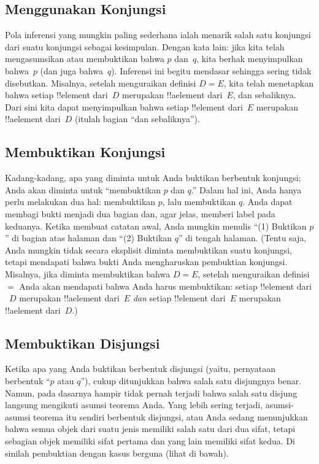 \documentclass[../../../include/open-logic-section]{subfiles}
\begin{document}
\subsection{Menggunakan Konjungsi}

Pola inferensi yang mungkin paling sederhana ialah menarik salah satu
konjungsi dari suatu konjungsi sebagai kesimpulan. Dengan kata lain:
jika kita telah mengasumsikan atau membuktikan bahwa $p$ dan~$q$, kita
berhak menyimpulkan bahwa~$p$ (dan juga bahwa~$q$). Inferensi ini begitu
mendasar sehingga sering tidak disebutkan. Misalnya, setelah
menguraikan definisi $D = E$, kita telah menetapkan bahwa setiap
!!{element} dari~$D$ merupakan !!a{element} dari~$E$, dan sebaliknya.
Dari sini kita dapat menyimpulkan bahwa setiap !!{element} dari~$E$
merupakan !!a{element} dari~$D$ (itulah bagian ``dan sebaliknya'').

\subsection{Membuktikan Konjungsi}

Kadang-kadang, apa yang diminta untuk Anda buktikan berbentuk
konjungsi; Anda akan diminta untuk ``membuktikan $p$ dan $q$.'' Dalam
hal ini, Anda hanya perlu melakukan dua hal: membuktikan $p$, lalu
membuktikan $q$. Anda dapat membagi bukti menjadi dua bagian dan, agar
jelas, memberi label pada keduanya. Ketika membuat catatan awal, Anda
mungkin menulis ``(1) Buktikan $p$'' di bagian atas halaman dan ``(2)
Buktikan $q$'' di tengah halaman. (Tentu saja, Anda mungkin tidak
secara eksplisit diminta membuktikan suatu konjungsi, tetapi mendapati
bahwa bukti Anda mengharuskan pembuktian konjungsi. Misalnya, jika
diminta membuktikan bahwa $D = E$, setelah menguraikan definisi~$=$ Anda
akan mendapati bahwa Anda harus membuktikan: setiap !!{element} dari
~$D$ merupakan !!a{element} dari~$E$ \emph{dan} setiap !!{element}
dari~$E$ merupakan !!a{element} dari~$D$.)

\subsection{Membuktikan Disjungsi}

Ketika apa yang Anda buktikan berbentuk disjungsi (yaitu, pernyataan
berbentuk ``$p$ atau $q$''), cukup ditunjukkan bahwa salah satu
disjungnya benar. Namun, pada dasarnya hampir tidak pernah terjadi
bahwa salah satu disjung langsung mengikuti asumsi teorema Anda. Yang
lebih sering terjadi, asumsi-asumsi teorema itu sendiri berbentuk
disjungsi, atau Anda sedang menunjukkan bahwa semua objek dari suatu
jenis memiliki salah satu dari dua sifat, tetapi sebagian objek
memiliki sifat pertama dan yang lain memiliki sifat kedua. Di sinilah
pembuktian dengan kasus berguna (lihat di bawah).
\end{document}
